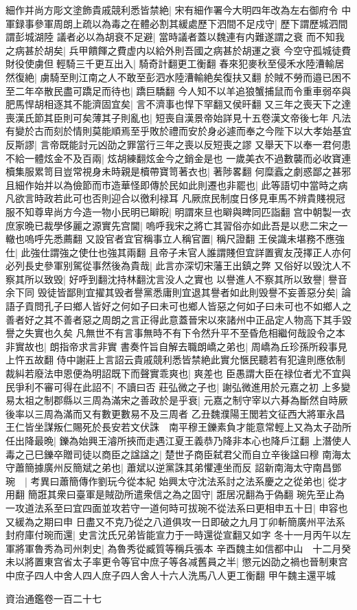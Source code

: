 細作并尚方彫文塗飾貴戚競利悉皆禁絶|{
	宋有細作署今大明四年改為左右御府令}
中軍録事參軍周朗上疏以為毒之在體必割其緩處歷下泗間不足戍守|{
	歷下謂歷城泗間謂彭城湖陸}
議者必以為胡衰不足避|{
	當時議者蓋以魏連有内難遂謂之衰}
而不知我之病甚於胡矣|{
	兵甲饋餫之費虚内以給外則吾國之病甚於胡運之衰}
今空守孤城徒費財役使虜但輕騎三千更互出入|{
	騎奇計翻更工衡翻}
春來犯麥秋至侵禾水陸漕輸居然復絶|{
	虜騎至則江南之人不敢至彭泗水陸漕輸絶矣復扶又翻}
於賊不勞而邉已困不至二年卒散民盡可蹻足而待也|{
	蹻巨驕翻}
今人知不以羊追狼蟹捕鼠而令重車弱卒與肥馬悍胡相逐其不能濟固宜矣|{
	言不濟事也悍下罕翻又侯旰翻}
又三年之喪天下之達喪漢氏節其臣則可矣薄其子則亂也|{
	短喪自漢景帝始詳見十五卷漢文帝後七年}
凡法有變於古而刻於情則莫能順焉至乎敗於禮而安於身必遽而奉之今陛下以大孝始基宜反斯謬|{
	言帝既能討元凶劭之罪當行三年之喪以反短喪之謬}
又舉天下以奉一君何患不給一體炫金不及百兩|{
	炫胡練翻炫金今之銷金是也}
一歲美衣不過數襲而必收寶連櫝集服累笥目豈常視身未時親是櫝帶寶笥著衣也|{
	著陟畧翻}
何糜蠧之劇惑鄙之甚邪且細作始并以為儉節而市造華怪即傳於民如此則遷也非罷也|{
	此等語切中當時之病凡欲言時政若此可也否則迎合以徼利禄耳}
凡厥庶民制度日侈見車馬不辨貴賤視冠服不知尊卑尚方今造一物小民明已䁹睨|{
	明謂來旦也䁹與睥同匹詣翻}
宫中朝製一衣庶家晩已裁學侈麗之源實先宫閫|{
	嗚呼我宋之將亡其習俗亦如此吾是以悲二宋之一轍也嗚呼先悉薦翻}
又設官者宜官稱事立人稱官置|{
	稱尺證翻}
王侯識未堪務不應強仕|{
	此強仕謂強之使仕也強其兩翻}
且帝子未官人誰謂賤但宜詳置賓友茂擇正人亦何必列長史參軍别駕從事然後為貴哉|{
	此言亦深切宋藩王出鎮之弊}
又俗好以毁沈人不察其所以致毁|{
	好呼到翻沈持林翻沈言没人之實也}
以譽進人不察其所以致譽|{
	譽音余下同}
毁徒皆鄙則宜擢其毁者譽黨悉庸則宜退其譽者如此則毁譽不妄善惡分矣|{
	論語子貢問孔子曰鄉人皆好之何如子曰未可也鄉人皆惡之何如子曰未可也不如鄉人之善者好之其不善者惡之周朗之言正得此意蓋晉宋以來諸州中正品定人物高下其手毀譽之失實也久矣}
凡無世不有言事無時不有下令然升平不至昏危相繼何哉設令之本非實故也|{
	朗指帝求言非實}
書奏忤旨自解去職朗嶠之弟也|{
	周嶠為丘珍孫所殺事見上忤五故翻}
侍中謝莊上言詔云貴戚競利悉皆禁絶此實允愜民聽若有犯違則應依制裁糾若廢法申恩便為明詔既下而聲實乖爽也|{
	爽差也}
臣愚謂大臣在禄位者尤不宜與民爭利不審可得在此詔不|{
	不讀曰否}
莊弘微之子也|{
	謝弘微進用於元嘉之初}
上多變易太祖之制郡縣以三周為滿宋之善政於是乎衰|{
	元嘉之制守宰以六朞為斷然自時厥後率以三周為滿而又有數更數易不及三周者}
乙丑魏濮陽王閭若文征西大將軍永昌王仁皆坐謀叛仁賜死於長安若文伏誅　南平穆王鑠素負才能意常輕上又為太子劭所任出降最晩|{
	鑠為始興王濬所挾而走遇江夏王義恭乃降非本心也降戶江翻}
上潛使人毒之己巳鑠卒贈司徒以商臣之諡諡之|{
	楚世子商臣弑君父而自立辛後諡曰穆}
南海太守蕭簡據廣州反簡斌之弟也|{
	蕭斌以逆黨誅其弟懼連坐而反}
詔新南海太守南昌鄧琬　|{
	考異曰蕭簡傳作劉玩今從本紀}
始興太守沈法系討之法系慶之之從弟也|{
	從才用翻}
簡誑其衆曰臺軍是賊劭所遣衆信之為之固守|{
	誑居况翻為于偽翻}
琬先至止為一攻道法系至曰宜四面並攻若守一道何時可拔琬不從法系曰更相申五十日|{
	申容也又緩為之期曰申}
日盡又不克乃從之八道俱攻一日即破之九月丁卯斬簡廣州平法系封府庫付琬而還|{
	史言沈氏兄弟皆能宣力于一時還從宣翻又如字}
冬十一月丙午以左軍將軍魯秀為司州刺史|{
	為魯秀從臧質等稱兵張本}
辛酉魏主如信都中山　十二月癸未以將置東宫省太子率更令等官中庶子等各减舊員之半|{
	懲元凶劭之禍也晉制東宫中庶子四人中舍人四人庶子四人舍人十六人洗馬八人更工衡翻}
甲午魏主還平城

資治通鑑卷一百二十七
